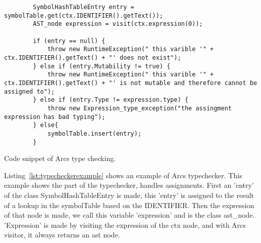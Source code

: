\begin{listing}[htb!]
    \begin{verbatim}
        SymbolHashTableEntry entry = symbolTable.get(ctx.IDENTIFIER().getText());
        AST_node expression = visit(ctx.expression(0));

        if (entry == null) {
            throw new RuntimeException(" this varible '" + ctx.IDENTIFIER().getText() + "' does not exist");
        } else if (entry.Mutability != true) {
            throw new RuntimeException(" this varible '" + ctx.IDENTIFIER().getText() + "' is not mutable and therefore cannot be assigned to");
        } else if (entry.Type != expression.type) {
            throw new Expression_type_exception("the assingment expression has bad typing");
        } else{
            symbolTable.insert(entry);
        }
    \end{verbatim}
    \caption{Code snippet of Arcs type checking.}
    \label{lst:typecheckerexample}
\end{listing}


Listing~\ref{lst:typecheckerexample} shows an example of Arcs typechecker. This example shows the part of the typechecker, handles assignments. First an 'entry' of the class SymbolHashTableEntry is made, this 'entry' is assigned to the result of a lookup in the symbolTable based on the IDENTIFIER. Then the expression of that node is made, we call this variable 'expression' and is the class \gls{ast}\_node. 'Expression' is made by visiting the expression of the ctx node, and with Arcs visitor, it always returns an \gls{ast} node.

